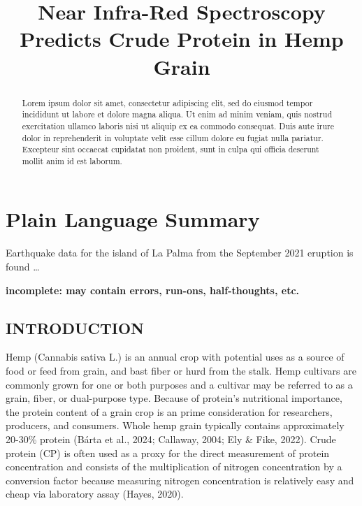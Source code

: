 \documentclass[
]{agujournal2019}
\begin{document}
\title{Near Infra-Red Spectroscopy Predicts Crude Protein in Hemp Grain}



\begin{abstract}
Lorem ipsum dolor sit amet, consectetur adipiscing elit, sed do eiusmod
tempor incididunt ut labore et dolore magna aliqua. Ut enim ad minim
veniam, quis nostrud exercitation ullamco laboris nisi ut aliquip ex ea
commodo consequat. Duis aute irure dolor in reprehenderit in voluptate
velit esse cillum dolore eu fugiat nulla pariatur. Excepteur sint
occaecat cupidatat non proident, sunt in culpa qui officia deserunt
mollit anim id est laborum.
\end{abstract}

\section*{Plain Language Summary}
Earthquake data for the island of La Palma from the September 2021
eruption is found \ldots{}



\textbf{incomplete: may contain errors, run-ons, half-thoughts, etc.}

\subsection{INTRODUCTION}\label{introduction}

Hemp (Cannabis sativa L.) is an annual crop with potential uses as a
source of food or feed from grain, and bast fiber or hurd from the
stalk. Hemp cultivars are commonly grown for one or both purposes and a
cultivar may be referred to as a grain, fiber, or dual-purpose type.
Because of protein's nutritional importance, the protein content of a
grain crop is an prime consideration for researchers, producers, and
consumers. Whole hemp grain typically contains approximately 20-30\%
protein (Bárta et al., 2024; Callaway, 2004; Ely \& Fike, 2022). Crude
protein (CP) is often used as a proxy for the direct measurement of
protein concentration and consists of the multiplication of nitrogen
concentration by a conversion factor because measuring nitrogen
concentration is relatively easy and cheap via laboratory assay (Hayes,
2020).
\end{document}

